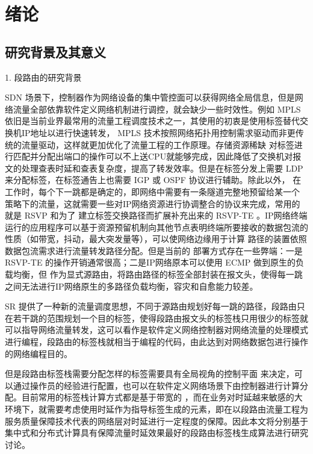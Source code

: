 
\chapter{绪论}
\section{研究背景及其意义}

1. 段路由的研究背景

\gls*{SDN} \cite{OPENFLOW, SDN} 场景下，控制器作为网络设备的集中管控面可以获得网络全局信息，但是网络流量全部依靠软件定义网络机制进行调控，就会缺少一些时效性。例如 \gls*{MPLS} 依旧是当前业界最常用的流量工程调度技术之一，其使用的初衷是使用标签替代交换机IP地址以进行快速转发， \gls*{MPLS} \cite{MPLS} 技术按照网络拓扑用控制需求驱动而非更传统的流量驱动，这样就更加优化了流量工程的工作原理。存储资源稀缺 \cite{TCAMMPLS, TCAMSDN} 对标签进行匹配并分配出端口的操作可以不上送CPU就能够完成，因此降低了交换机对报文的处理查表时延和查表复杂度，提高了转发效率。但是在标签分发上需要 \gls*{LDP} 来分配标签，在标签通告上也需要 \gls*{IGP} 或 \gls*{OSPF} 协议进行辅助。除此以外， \cite{MPLS} 在工作时，每个下一跳都是确定的，即网络中需要有一条隧道完整地预留给某一个 \cite{MPLS} 策略下的流量，这就需要一些对IP网络资源进行协调整合的协议来完成，常用的就是 \gls*{RSVP} \cite{RSVP} 和为了 \cite{MPLS} 建立标签交换路径而扩展补充出来的 \gls*{RSVP-TE} 。IP网络终端运行的应用程序可以基于资源预留机制向其他节点表明终端所要接收的数据包流的性质（如带宽，抖动，最大突发量等），可以使网络边缘用于计算 \cite{MPLS} 路径的装置依照数据包流需求进行流量转发路径分配。但是当前的 \cite{MPLS} 部署方式存在一些弊端：一是 \gls*{RSVP-TE} 的操作开销通常很高；二是IP网络原本可以使用 \gls*{ECMP} 做到原生的负载均衡，但 \cite{MPLS} 作为显式源路由，将路由路径的标签全部封装在报文头，使得每一跳之间无法进行IP网络原生的多路径负载均衡，容灾和自愈能力较差。

\gls*{SR} \cite*{SRARK} 提供了一种新的流量调度思想，不同于源路由规划好每一跳的路径，段路由只在若干跳的范围规划一个目的标签，使得段路由报文头的标签栈只用很少的标签就可以指导网络流量转发，这可以看作是软件定义网络控制器对网络流量的处理模式进行编程，段路由的标签栈就相当于编程的代码，由此达到对网络数据包进行操作的网络编程目的。

但是段路由标签栈需要分配怎样的标签需要具有全局视角的控制平面 \cite{SRARK} 来决定，可以通过操作员的经验进行配置，也可以在软件定义网络场景下由控制器进行计算分配。目前常用的标签栈计算方式都是基于带宽的 \cite{SIDLENGTHPROVE, SIDLENGTHANALYSIS, SRQOE, SRMULTIPATH, SRLABELSTACK, SRNODETE, SRBANDWIDTH1, SRBANDWIDTH2, SRBANDWIDTH3, SRBANDWIDTH4, SRBANDWIDTH5, SRBANDWIDTH6, SRBANDWIDTH7, SRBANDWIDTH8, SRBANDWIDTH9, SRBANDWIDTH11, SRBANDWIDTH12}，而在业务对时延越来敏感的大环境下，就需要考虑使用时延作为指导标签生成的元素，即在以段路由流量工程为服务质量保障技术代表的网络层对时延进行一定程度的保障。因此本文将分别基于集中式和分布式计算具有保障流量时延效果最好的段路由标签栈生成算法进行研究讨论。

